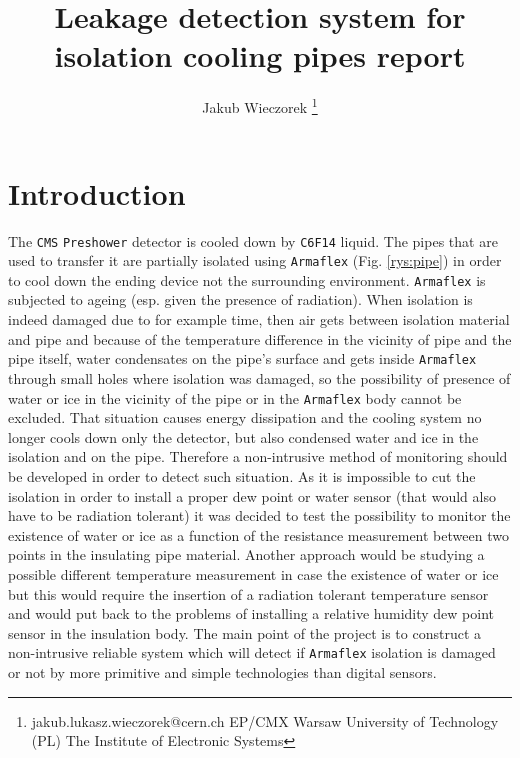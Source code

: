 \documentclass[a4paper, keeplastbox]{jacow}
\def\figurename{Fig.}
\begin{document}
\title{Leakage detection system for isolation cooling pipes report}

\author{Jakub Wieczorek \thanks{jakub.lukasz.wieczorek@cern.ch EP/CMX Warsaw University of Technology (PL) The Institute of Electronic Systems}}

\maketitle

\section{Introduction}
The \verb|CMS| \verb|Preshower| detector is cooled down by \verb|C6F14| liquid. The pipes that are used to transfer it are partially isolated using \verb|Armaflex| (\figurename{} \ref{rys:pipe}) in order to cool down the ending device not the surrounding environment. \verb|Armaflex| is subjected to ageing (esp. given the presence of radiation). When isolation is indeed damaged due to for example time, then air gets between isolation material and pipe and because of the temperature difference in the vicinity of pipe and the pipe itself, water condensates on the pipe's surface and gets inside \verb|Armaflex| through small holes where isolation was damaged, so the possibility of presence of water or ice in the vicinity of the pipe or in the \verb|Armaflex| body cannot be excluded. That situation causes energy dissipation and the cooling system no longer cools down only the detector, but also condensed water and ice in the isolation and on the pipe. Therefore a non-intrusive method of monitoring should be developed in order to detect such situation. As it is impossible to cut the isolation in order to install a proper dew point or water sensor (that would also have to be radiation tolerant) it was decided to test the possibility to monitor the existence of water or ice as a function of the resistance measurement between two points in the insulating pipe material. Another approach would be studying a possible different temperature measurement in case the existence of water or ice but this would require the insertion of a radiation tolerant temperature sensor and would put back to the problems of installing a relative humidity dew point sensor in the insulation body. The main point of the project is to construct a non-intrusive reliable system which will detect if \verb|Armaflex| isolation is damaged or not by more primitive and simple technologies than digital sensors.
\end{document}
